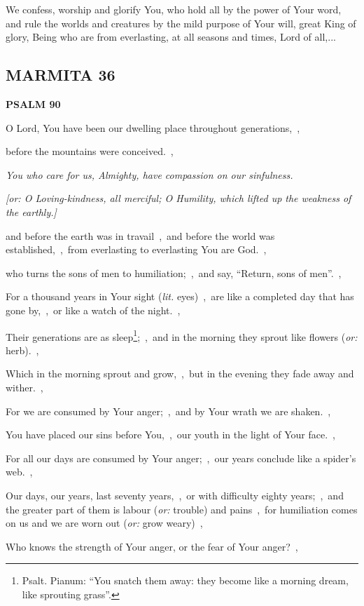 \documentclass[12pt,twoside,a5paper]{article}
\newcommand{\marmita}[1]{\subsection*{MARMITA {#1}}}
\newcommand{\psalm}[1]{\textbf{PSALM {#1}}\nopagebreak}
\newcommand{\qanona}[1]{{\liturgicalhint{Qanona.} \emph{#1}}}
\newcommand{\slota}[1]{\liturgicalhint{Slota.} #1}
\newcommand{\translationoption}[1]{\emph{or:} #1}
\newcommand{\translationliteral}[1]{\emph{lit.} #1}
\begin{document}
\slota{We confess, worship and glorify You, who hold all by the power of Your word, and rule the worlds and creatures by the mild purpose of Your will, great King of glory, Being who are from everlasting, at all seasons and times, Lord of all,...}

\marmita{36}

\psalm{90}

\begin{normalparskip}
  O Lord, You have been our dwelling place throughout generations,~\sep

  before the mountains were conceived.~\sep

  \qanona{You who care for us, Almighty, have compassion on our sinfulness.}

  \emph{[\translationoption{O Loving-kindness, all merciful; O Humility, which lifted up the weakness of the earthly.}]}

  and before the earth was in travail~\sep\ and before the world was established,~\sep\ from everlasting to everlasting You are God.~\sep

  who turns the sons of men to humiliation;~\sep\ and say, ``Return, sons of men''.~\sep

  For a thousand years in Your sight (\translationliteral{eyes})~\sep\ are like a completed day that has gone by,~\sep\ or like a watch of the night.~\sep

  Their generations are as sleep\footnote{Psalt. Pianum: ``You snatch them away: they become like a morning dream, like sprouting grass''.};~\sep\ and in the morning they sprout like flowers (\translationoption{herb}).~\sep

  Which in the morning sprout and grow,~\sep\ but in the evening they fade away and wither.~\sep

  For we are consumed by Your anger;~\sep\ and by Your wrath we are shaken.~\sep

  You have placed our sins before You,~\sep\ our youth in the light of Your face.~\sep

  For all our days are consumed by Your anger;~\sep\ our years conclude like a spider's web.~\sep

  Our days, our years, last seventy years,~\sep\ or with difficulty eighty years;~\sep\ and the greater part of them is labour (\translationoption{trouble}) and pains~\sep\ for humiliation comes on us and we are worn out (\translationoption{grow weary})~\sep

  Who knows the strength of Your anger, or the fear of Your anger?~\sep


\end{normalparskip}
\end{document}
